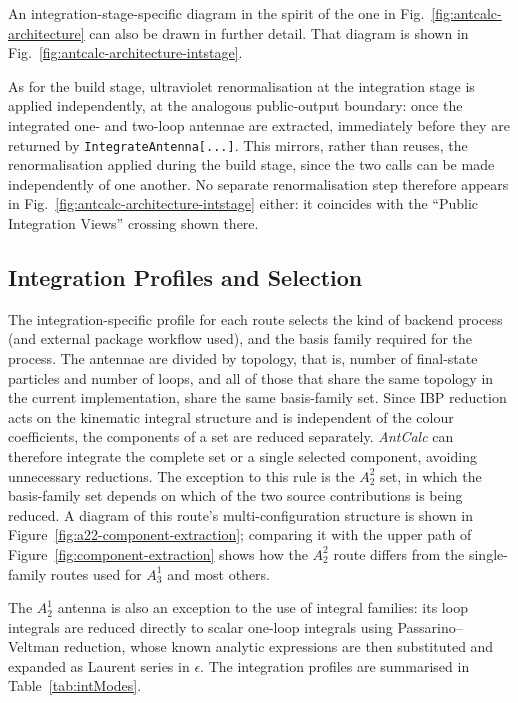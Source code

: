 An integration-stage-specific diagram in the spirit of the one in
Fig.~\ref{fig:antcalc-architecture} can also be drawn in further detail. 
That diagram is shown in Fig.~\ref{fig:antcalc-architecture-intstage}.



As for the build stage, ultraviolet renormalisation at the integration stage is applied
independently, at the analogous public-output boundary: once the integrated one- and two-loop
antennae are extracted, immediately before they are returned by \texttt{IntegrateAntenna[...]}.
This mirrors, rather than reuses, the renormalisation applied during the build stage, since the
two calls can be made independently of one another. No separate renormalisation step therefore
appears in Fig.~\ref{fig:antcalc-architecture-intstage} either: it coincides with the ``Public
Integration Views'' crossing shown there.

\subsection{Integration Profiles and Selection}

The integration-specific profile for each route selects the kind of backend process (and
external package workflow used), and the basis family required for the process. The antennae
are divided by topology, that is, number of final-state particles and number of loops, and all
of those that share the same topology in the current implementation, share the same basis-family
set. Since IBP reduction acts on the kinematic integral structure and is independent of the colour
coefficients, the components of a set are reduced separately. \textit{AntCalc} can therefore
integrate the complete set or a single selected component, avoiding unnecessary reductions.
The exception to this rule is the $A_2^2$ set, in which the basis-family set depends on which of the two source contributions is being reduced. A diagram of this route's multi-configuration structure is shown in
Figure~\ref{fig:a22-component-extraction}; comparing it with the upper path of
Figure~\ref{fig:component-extraction} shows how the $A_2^2$ route differs from the
single-family routes used for $A_3^1$ and most others.

The $A_2^1$ antenna is also an exception to the use of integral families: its
loop integrals are reduced directly to scalar one-loop integrals using Passarino--Veltman
reduction, whose known analytic expressions are then substituted and expanded as Laurent
series in $\epsilon$. The integration profiles are summarised in Table~\ref{tab:intModes}.

